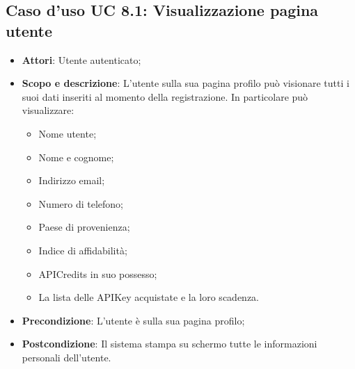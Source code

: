 \documentclass[12pt,a4paper,titlepage]{article}
\begin{document}
	\subsection{Caso d'uso UC 8.1: Visualizzazione pagina utente}
	\label{UC8.1}
	\begin{itemize}
		\item \textbf{Attori}: Utente autenticato;
		\item \textbf{Scopo e descrizione}: L'utente sulla sua pagina profilo può visionare tutti i suoi dati inseriti al momento della registrazione. In particolare può visualizzare:
		\begin{itemize}
			\item Nome utente;
			\item Nome e cognome;
			\item Indirizzo email;
			\item Numero di telefono;
			\item Paese di provenienza;
			\item Indice di affidabilità;
			\item APICredits in suo possesso;
			\item La lista delle APIKey acquistate e la loro scadenza.
		\end{itemize}
		\item \textbf{Precondizione}: L'utente è sulla sua pagina profilo;
		\item \textbf{Postcondizione}: Il sistema stampa su schermo tutte le informazioni personali dell'utente.
	\end{itemize}
\end{document}
